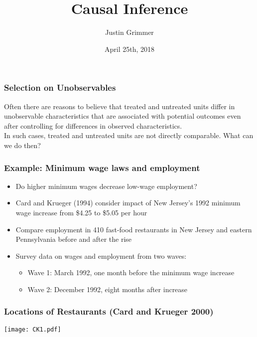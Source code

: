 \documentclass{beamer}
\title[Causal Inference] %
{Causal Inference}
\author{Justin Grimmer}
\institute[University of Chicago]{Associate Professor\\Department of Political Science \\  University of Chicago}
\date{April 25th, 2018}
\numberwithin{equation}{section}
\begin{document}
\begin{frame}
\titlepage
\end{frame}



\begin{frame}
  \frametitle{Selection on Unobservables}
\begin{Problem}
Often there are reasons to believe that treated and untreated units differ in unobservable
characteristics that are associated with potential outcomes even
after controlling for differences in observed characteristics.\\\bigskip In
such cases, treated and untreated units are not directly comparable. What can we
do then?
\end{Problem}
\end{frame}



\begin{frame}
  \frametitle{Example: Minimum wage laws and employment}
\begin{itemize}
\item Do higher minimum wages decrease low-wage employment?\medskip
 \item Card and Krueger (1994) consider impact of New Jersey's 1992 minimum wage increase from \$4.25 to \$5.05 per hour\medskip
 \item Compare employment in 410 fast-food restaurants in
New Jersey and eastern Pennsylvania before and after the rise\medskip
\item Survey data on wages and employment from two waves:
\begin{itemize}
  \item Wave 1: March 1992, one month before the minimum wage increase
  \item Wave 2: December 1992, eight months after increase
\end{itemize}
\end{itemize}
\end{frame}

\begin{frame}
  \frametitle{Locations of Restaurants (Card and Krueger 2000)}
\begin{center}
\texttt{[image: CK1.pdf]}
\end{center}
\end{frame}
\end{document}
